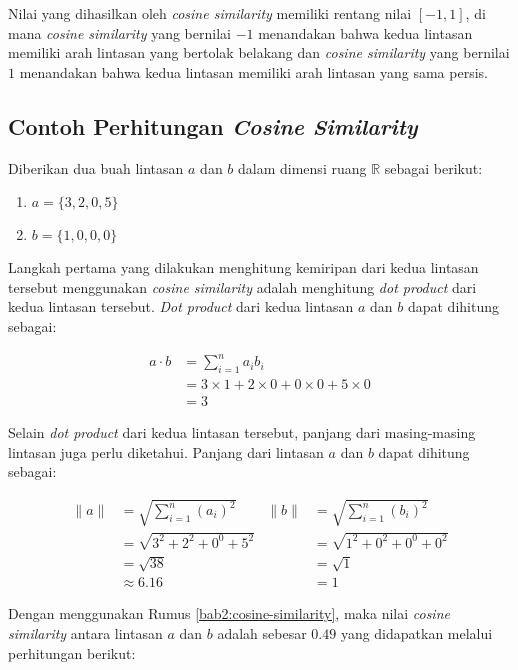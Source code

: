 Nilai yang dihasilkan oleh \textit{cosine similarity} memiliki rentang nilai $[-1, 1]$, di mana \textit{cosine similarity} yang bernilai $-1$ menandakan bahwa kedua lintasan memiliki arah lintasan yang bertolak belakang dan \textit{cosine similarity} yang bernilai $1$ menandakan bahwa kedua lintasan memiliki arah lintasan yang sama persis.

\subsection{Contoh Perhitungan \textit{Cosine Similarity}}
\label{subsec:contoh-cosine}

Diberikan dua buah lintasan $a$ dan $b$ dalam dimensi ruang $\mathbb{R}$ sebagai berikut:

\begin{enumerate}
    \item $a = \{ 3, 2, 0, 5 \}$
    \item $b = \{ 1, 0, 0, 0 \}$
\end{enumerate}

Langkah pertama yang dilakukan menghitung kemiripan dari kedua lintasan tersebut menggunakan \textit{cosine similarity} adalah menghitung \textit{dot product} dari kedua lintasan tersebut. \textit{Dot product} dari kedua lintasan $a$ dan $b$ dapat dihitung sebagai:

\begin{align*}
    a \cdot b & =  \sum_{i=1}^{n}{a_i b_i} \\
    & = 3 \times 1 + 2 \times 0 + 0 \times 0 + 5 \times 0 \\
    & = 3
\end{align*}

Selain \textit{dot product} dari kedua lintasan tersebut, panjang dari masing-masing lintasan juga perlu diketahui. Panjang dari lintasan $a$ dan $b$ dapat dihitung sebagai:

\begin{align*}
    \|a\| & = \sqrt{\sum_{i=1}^{n}{(a_i)^2}} & \|b\| & = \sqrt{\sum_{i=1}^{n}{(b_i)^2}} \\
    & = \sqrt{3^2 + 2^2 + 0^0 + 5^2} & & = \sqrt{1^2 + 0^2 + 0^0 + 0^2}  \\
    & = \sqrt{38} & & = \sqrt{1} \\
    & \approx 6.16 & & = 1
\end{align*}

Dengan menggunakan Rumus \ref{bab2:cosine-similarity}, maka nilai \textit{cosine similarity} antara lintasan $a$ dan $b$ adalah sebesar $0.49$ yang didapatkan melalui perhitungan berikut:

